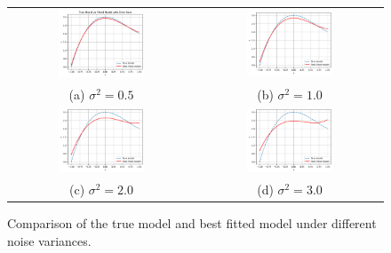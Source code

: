 \begin{figure}
\centering
\setlength{\tabcolsep}{2pt} %
\renewcommand{\arraystretch}{0.5} %
\begin{tabular}{@{}cc@{}}
\includegraphics[width=0.48\textwidth]{MSc_Statistics_Research_Report_Template/images/sigma0.5.png} &
\includegraphics[width=0.48\textwidth]{MSc_Statistics_Research_Report_Template/images/sigma1.0.png} \\
\small (a) $\sigma^2=0.5$ & \small (b) $\sigma^2=1.0$ \\
\includegraphics[width=0.48\textwidth]{MSc_Statistics_Research_Report_Template/images/sigma2.0.png} &
\includegraphics[width=0.48\textwidth]{MSc_Statistics_Research_Report_Template/images/sigma3.0.png} \\
\small (c) $\sigma^2=2.0$ & \small (d) $\sigma^2=3.0$
\end{tabular}
\caption{Comparison of the true model and best fitted model under different noise variances.}
\label{fig:true_vs_fitted}
\end{figure}







